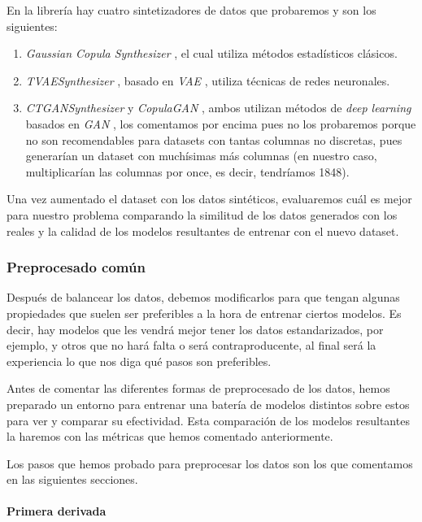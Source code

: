 En la librería hay cuatro sintetizadores de datos que probaremos y son los siguientes:

\begin{enumerate}
    \item \textit{Gaussian Copula Synthesizer} \cite{Gaussian4:online}, el cual utiliza métodos estadísticos clásicos.
    \item \textit{TVAESynthesizer} \cite{TVAESynt0:online}, basado en \textit{VAE} \cite{Variatio61:online}, utiliza técnicas de redes neuronales.
    \item \textit{CTGANSynthesizer} \cite{CTGANSyn50:online} y \textit{CopulaGAN} \cite{CopulaGA37:online}, ambos utilizan métodos de \textit{deep learning} basados en \textit{GAN} \cite{Generati72:online}, los comentamos por encima pues no los probaremos porque no son recomendables para datasets con tantas columnas no discretas, pues generarían un dataset con muchísimas más columnas (en nuestro caso, multiplicarían las columnas por once, es decir, tendríamos 1848). 
\end{enumerate}

Una vez aumentado el dataset con los datos sintéticos, evaluaremos cuál es mejor para nuestro problema comparando la similitud de los datos generados con los reales y la calidad de los modelos resultantes de entrenar con el nuevo dataset.


\subsubsection{Preprocesado común}

Después de balancear los datos, debemos modificarlos para que tengan algunas propiedades que suelen ser preferibles a la hora de entrenar ciertos modelos. Es decir, hay modelos que les vendrá mejor tener los datos estandarizados, por ejemplo, y otros que no hará falta o será contraproducente, al final será la experiencia lo que nos diga qué pasos son preferibles.

Antes de comentar las diferentes formas de preprocesado de los datos, hemos preparado un entorno para entrenar una batería de modelos distintos sobre estos para ver y comparar su efectividad. Esta comparación de los modelos resultantes la haremos con las métricas que hemos comentado anteriormente.


Los pasos que hemos probado para preprocesar los datos son los que comentamos en las siguientes secciones.

\paragraph{Primera derivada}

